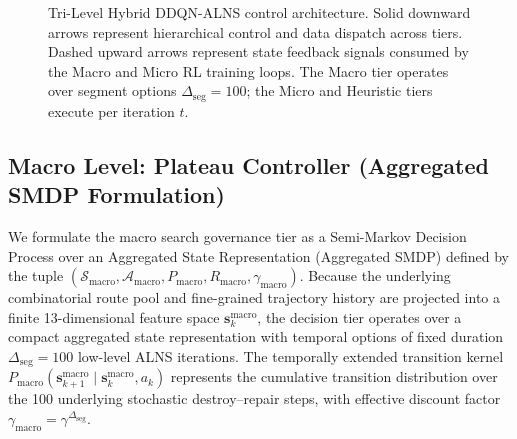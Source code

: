 \documentclass{ieeeaccess}
\begin{document}
\begin{figure}[!t]
{%
}
\caption{Tri-Level Hybrid DDQN-ALNS control architecture. Solid downward arrows represent hierarchical control and data dispatch across tiers. Dashed upward arrows represent state feedback signals consumed by the Macro and Micro RL training loops. The Macro tier operates over segment options $\Delta_{\text{seg}}=100$; the Micro and Heuristic tiers execute per iteration $t$.}
\label{fig:architecture}
\end{figure}

\subsection{Macro Level: Plateau Controller (Aggregated SMDP Formulation)}
\label{sec:macro_controller}

We formulate the macro search governance tier as a Semi-Markov Decision Process\cite{sutton1999between} over an Aggregated State Representation (Aggregated SMDP) defined by the tuple $(\mathcal{S}_{\text{macro}}, \mathcal{A}_{\text{macro}}, P_{\text{macro}}, R_{\text{macro}}, \gamma_{\text{macro}})$. Because the underlying combinatorial route pool and fine-grained trajectory history are projected into a finite 13-dimensional feature space $\mathbf{s}_k^{\text{macro}}$, the decision tier operates over a compact aggregated state representation with temporal options of fixed duration $\Delta_{\text{seg}} = 100$ low-level ALNS iterations. The temporally extended transition kernel $P_{\text{macro}}(\mathbf{s}_{k+1}^{\text{macro}} \mid \mathbf{s}_k^{\text{macro}}, a_k)$ represents the cumulative transition distribution over the 100 underlying stochastic destroy--repair steps, with effective discount factor $\gamma_{\text{macro}} = \gamma^{\Delta_{\text{seg}}}$.
\end{document}

